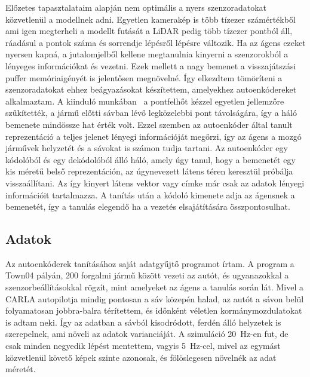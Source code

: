 \documentclass[a4paper,12pt,oneside]{article}
\begin{document}
Előzetes tapasztalataim alapján nem optimális a nyers szenzoradatokat
közvetlenül a modellnek adni. Egyetlen kamerakép is több tízezer számértékből ami igen megterheli a modellt futását
a LiDAR pedig több tízezer pontból áll, ráadásul a pontok száma
és sorrendje lépésről lépésre változik. Ha az ágens ezeket nyersen kapná, a
jutalomjelből kellene megtanulnia kinyerni a szenzorokból a lényeges információkat és vezetni. 
Ezek mellett a nagy bemenet a visszajátszási puffer
memóriaigényét is jelentősen megnövelné. 
Így elkezdtem tömöríteni a szenzoradatokat ehhez beágyazásokat készítettem, 
amelyekhez autoenkódereket alkalmaztam.
A kiinduló munkában~\cite{terapaptommakol2022obstacle} a pontfelhőt kézzel egyetlen jellemzőre
szűkítették, a jármű előtti sávban lévő legközelebbi pont távolságára, így a háló bemenete
mindössze hat érték volt. 
Ezzel szemben az autoenkóder által tanult reprezentáció a teljes jelenet
lényegi információját megőrzi, így az ágens a mozgó járművek helyzetét és a sávokat is számon tudja tartani.
Az autoenkóder egy kódolóból és egy dekódolóból álló háló, amely úgy tanul,
hogy a bemenetét egy kis méretű belső reprezentáción, az úgynevezett látens téren
keresztül próbálja visszaállítani. Az így kinyert látens vektor vagy címke már csak az adatok lényegi információit
tartalmazza. A tanítás után a kódoló kimenete adja az ágensnek a bemenetét, így a 
tanulás elegendő ha a vezetés elsajátítására összpontosulhat.

\subsection{Adatok}
\label{sec:data}

Az autoenkóderek tanításához saját adatgyűjtő programot írtam. A program a Town04 pályán,
200 forgalmi jármű között vezeti az autót, és ugyanazokkal a szenzorbeállításokkal rögzít,
mint amelyeket az ágens a tanulás során lát. Mivel a CARLA autopilotja mindig pontosan a sáv
közepén halad, az autót a sávon belül folyamatosan jobbra-balra térítettem, és időnként
véletlen kormánymozdulatokat is adtam neki. Így az adatban a sávból kisodródott, ferdén álló
helyzetek is szerepelnek, ami növeli az adatok varianciáját. A szimuláció 20~Hz-en fut, de
csak minden negyedik lépést mentettem, vagyis 5~Hz-cel, mivel az egymást közvetlenül követő
képek szinte azonosak, és fölöslegesen növelnék az adat méretét.
\end{document}
